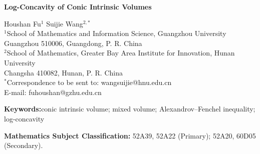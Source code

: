 \documentclass[12pt,a4paper]{article}
\numberwithin{equation}{section}
\theoremstyle{definition}
\theoremstyle{remark}
\newcommand{\R}{\mathbb{R}}
\begin{document}
\begin{center}
{\Large\bf Log-Concavity of Conic Intrinsic Volumes}\\[7pt]
\end{center}
\vskip3mm

\begin{center}
Houshan Fu$^{1}$ \quad Suijie Wang$^{2,*}$\\[8pt]
  
$^{1}$School of Mathematics and Information Science, Guangzhou University\\
Guangzhou 510006, Guangdong, P. R. China\\[8pt]

$^{2}$School of Mathematics, Greater Bay Area Institute for Innovation, Hunan University\\
 Changsha 410082, Hunan, P. R. China\\[8pt]

$^*$Correspondence to be sent to: wangsuijie@hnu.edu.cn\\
E-mail: fuhoushan@gzhu.edu.cn\\[12pt]
\end{center}
\vskip 3mm 	


\begin{abstract}
Let $n\ge1$ and $C\subseteq\R^n$ be a closed convex cone with conic intrinsic volumes $v_0(C),\ldots,v_n(C)$.  We prove the long-standing log-concavity conjecture for this sequence, in the stronger form
\[
 v_k(C)^2\ge \rho_k\rho_{n-k}v_{k-1}(C)v_{k+1}(C),  \qquad 1\le k\le n-1,
\]
where, for $l\ge1$, $\rho_l=\frac{l+1}{l}\frac{\omega_{l-1}\omega_{l+1}}{\omega_l^2}>1$ and $\omega_j$ is the volume of the Euclidean unit ball in $\R^j$.  The proof applies
the Alexandrov--Fenchel inequality to the Takemura--Kuriki identity
\[
 V(A[k],D[n-k])=\frac{\omega_k\omega_{n-k}}{\binom nk}v_k(C),\qquad A=C\cap B^n,\quad D=C^\circ\cap B^n,
\]
where $C^\circ$ is the polar cone, $B^n$ is the Euclidean unit ball, and repeated arguments are indicated by brackets.  A Master Steiner argument gives the identity directly for arbitrary closed convex cones, including degenerate ones.  We also give a circular-cone counterexample to the standard ultra-log-concavity normalizations.
\end{abstract}

\noindent\textbf{Keywords:}conic intrinsic volume; mixed volume; Alexandrov--Fenchel inequality;
log-concavity

\medskip
\noindent\textbf{Mathematics Subject Classification:}
52A39, 52A22 (Primary); 52A20, 60D05 (Secondary).
\end{document}
